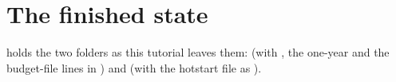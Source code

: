 \section{The finished state}
 holds the two folders as this tutorial leaves them:  (with
, the one-year  and the budget-file lines in ) and  (with the
hotstart file as ).
